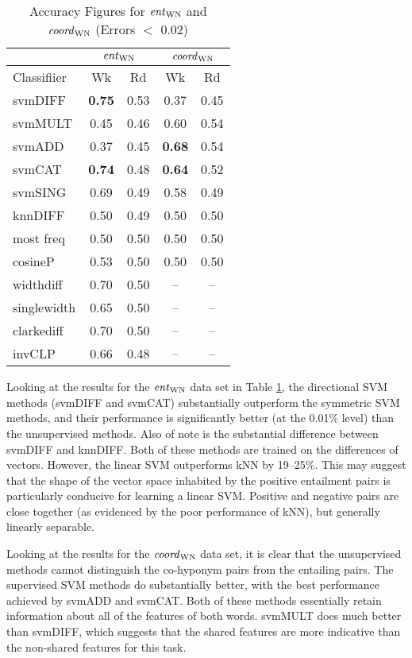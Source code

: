 \documentclass[11pt]{article}
\newcommand\entWN{\mbox{\em ent\/}_{\mbox{\scriptsize WN}}}
\newcommand\coordWN{\mbox{\em coord\/}_{\mbox{\scriptsize WN}}}
\begin{document}
\begin{table}[ht]
\centering
\begin{tabular}{|l|c|c|c|c|}
\hline
&\multicolumn{2}{|c|}{$\entWN$}&\multicolumn{2}{|c|}{$\coordWN$}\\
\hline
Classifiier&Wk&Rd&Wk&Rd\\
\hline
svmDIFF&\textbf{0.75}&0.53&0.37&0.45\\
svmMULT&0.45&0.46&0.60&0.54\\
svmADD&0.37&0.45&\textbf{0.68}&0.54\\
svmCAT&\textbf{0.74}&0.48&\textbf{0.64}&0.52\\
svmSING&0.69&0.49&0.58&0.49\\
knnDIFF&0.50&0.49&0.50&0.50\\
\hline
most freq&0.50&0.50&0.50&0.50\\
cosineP&0.53&0.50&0.50&0.50\\
widthdiff&0.70&0.50&--&--\\
singlewidth&0.65&0.50&--&--\\
clarkediff&0.70&0.50&--&--\\
invCLP&0.66&0.48&--&--\\
\hline
\end{tabular}
\caption{Accuracy Figures for $\entWN$ and $\coordWN$ (Errors $<$ 0.02)}
\label{table:results_WN}
\end{table}

Looking at the results for the $\entWN$ data set in Table \ref{table:results_WN}, the directional SVM methods (svmDIFF and svmCAT)  substantially outperform the symmetric SVM methods, and their performance is significantly better (at the 0.01\% level) than the unsupervised methods.  Also of note is the substantial difference between svmDIFF and knnDIFF.  Both of these methods are trained on the differences of vectors.  However, the linear SVM outperforms kNN by 19--25\%.  This may suggest that the shape of the vector space inhabited by the positive entailment pairs is particularly conducive for learning a linear SVM.  Positive and negative pairs are close together (as evidenced by the poor performance of kNN), but generally linearly separable.

Looking at the results for the $\coordWN$ data set, it is clear that the unsupervised methods cannot distinguish the co-hyponym pairs from the entailing pairs.  The supervised SVM methods do substantially better, with the best performance achieved by svmADD and svmCAT.  Both of these methods essentially retain information about all of the features of both words.  svmMULT does much better than svmDIFF, which suggests that the shared features are more indicative than the non-shared features for this task. 
\end{document}

